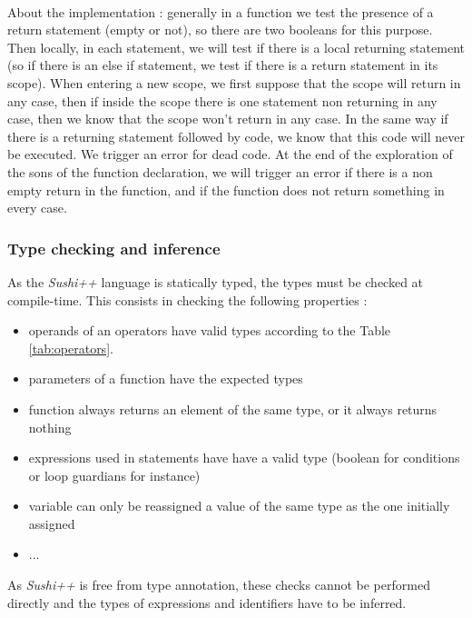 \documentclass[a4paper,11pt]{article}
\begin{document}
\paragraph{}
About the implementation : generally in a function we test the presence of a return statement (empty or not), so there are two booleans for this purpose. Then locally, in each statement, we will test if there is a local returning statement (so if there is an else if statement, we test if there is a return statement in its scope). When entering a new scope, we first suppose that the scope will return in any case, then if inside the scope there is one statement non returning in any case, then we know that the scope won't return in any case. In the same way if there is a returning statement followed by code, we know that this code will never be executed. We trigger an error for dead code.  At the end of the exploration of the sons of the function declaration, we will trigger an error if there is a non empty return in the function, and if the function does not return something in every case. 
\subsubsection{Type checking and inference}
As the \textit{Sushi++} language is statically typed, the types must be checked at compile-time. This consists in checking the following properties :
\begin{itemize}
	\item operands of an operators have valid types according to the Table \ref{tab:operators}.
	\item parameters of a function have the expected types
	\item function always returns an element of the same type, or it always returns nothing
	\item expressions used in statements have have a valid type (boolean for conditions or loop guardians for instance)
	\item variable can only be reassigned a value of the same type as the one initially assigned
	\item ...
\end{itemize}
As \textit{Sushi++} is free from type annotation, these checks cannot be performed directly and the types of expressions and identifiers have to be inferred. 
\end{document}
